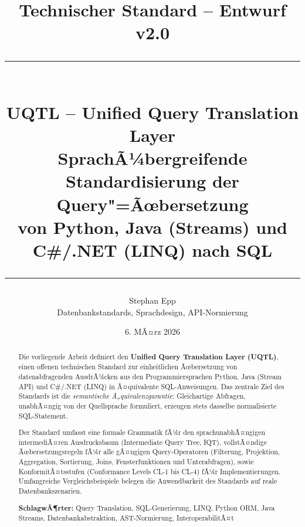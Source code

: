 ﻿\documentclass[12pt,a4paper]{article}
\title{%
  \vspace{-1cm}%
  {\large Technischer Standard -- Entwurf v2.0}\\[0.5em]
  \rule{\linewidth}{0.6pt}\\[0.5em]
  {\LARGE\bfseries UQTL -- Unified Query Translation Layer}\\[0.3em]
  {\large SprachÃ¼bergreifende Standardisierung der Query"=Ãœbersetzung\\
  von Python, Java (Streams) und C\#/.NET (LINQ) nach SQL}\\[0.5em]
  \rule{\linewidth}{0.6pt}%
}
\author{%
  Stephan Epp\\[0.3em]
  \small Datenbankstandards, Sprachdesign, API-Normierung
}
\date{6. MÃ¤rz 2026}
\theoremstyle{definition}
\theoremstyle{plain}
\theoremstyle{remark}
\begin{document}

\maketitle
\thispagestyle{empty}

\begin{abstract}
\noindent
Die vorliegende Arbeit definiert den \textbf{Unified Query Translation Layer (UQTL)},
einen offenen technischen Standard zur einheitlichen Ãœbersetzung von
datenabfragenden AusdrÃ¼cken aus den Programmiersprachen Python, Java (Stream API)
und C\#/.NET (LINQ) in Ã¤quivalente SQL-Anweisungen. Das zentrale Ziel des Standards
ist die \emph{semantische Ã„quivalenzgarantie}: Gleichartige Abfragen, unabhÃ¤ngig
von der Quellsprache formuliert, erzeugen stets dasselbe normalisierte SQL-Statement.

Der Standard umfasst eine formale Grammatik fÃ¼r den sprachunabhÃ¤ngigen intermediÃ¤ren
Ausdrucksbaum (Intermediate Query Tree, IQT), vollstÃ¤ndige Ãœbersetzungsregeln
fÃ¼r alle gÃ¤ngigen Query-Operatoren (Filterung, Projektion, Aggregation,
Sortierung, Joins, Fensterfunktionen und Unterabfragen), sowie KonformitÃ¤tsstufen
(Conformance Levels CL-1 bis CL-4) fÃ¼r Implementierungen. Umfangreiche
Vergleichsbeispiele belegen die Anwendbarkeit des Standards auf reale
Datenbankszenarien.

\medskip
\noindent\textbf{SchlagwÃ¶rter:} Query Translation, SQL-Generierung, LINQ, Python ORM,
Java Streams, Datenbankabstraktion, AST-Normierung, InteroperabilitÃ¤t
\end{abstract}

\newpage
\tableofcontents
\newpage


\newpage

\newpage

\newpage

\newpage

\newpage

\newpage

\newpage

\newpage

\newpage


\end{document}
